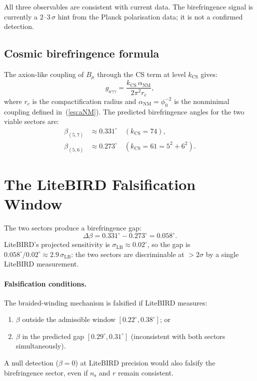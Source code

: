 \documentclass[12pt,a4paper]{article}
\newcommand{\kcs}{k_{\mathrm{CS}}}
\newcommand{\phiz}{\phi_0}
\newcommand{\ns}{n_{\mathrm{s}}}
\newcommand{\aNM}{\alpha_{\mathrm{NM}}}
\begin{document}
All three observables are consistent with current data.  The birefringence
signal is currently a $2$--$3\,\sigma$ hint from the Planck polarisation data;
it is not a confirmed detection.

\subsection{Cosmic birefringence formula}

The axion-like coupling of $B_\mu$ through the CS term at level $\kcs$ gives:
\begin{equation}
  g_{a\gamma\gamma} = \frac{\kcs\,\aNM}{2\pi^2 r_c} ,
  \label{eq:gcoup}
\end{equation}
where $r_c$ is the compactification radius and $\aNM=\phiz^{-2}$ is the
nonminimal coupling defined in~(\ref{eq:aNM}).
The predicted birefringence angles for the two viable sectors are:
\begin{align}
  \beta_{(5,7)} &\approx 0.331^\circ \quad (\kcs=74) , \\
  \beta_{(5,6)} &\approx 0.273^\circ \quad (\kcs=61=5^2+6^2) .
\end{align}

\section{The LiteBIRD Falsification Window}
\label{sec:litebird}

The two sectors produce a birefringence gap:
\begin{equation}
  \Delta\beta = 0.331^\circ - 0.273^\circ = 0.058^\circ .
  \label{eq:gap}
\end{equation}
LiteBIRD's projected sensitivity is $\sigma_{\mathrm{LB}}\approx 0.02^\circ$,
so the gap is $0.058^\circ/0.02^\circ \approx 2.9\,\sigma_{\mathrm{LB}}$:
the two sectors are discriminable at $>2\sigma$ by a single LiteBIRD
measurement.

\paragraph{Falsification conditions.}
The braided-winding mechanism is falsified if LiteBIRD measures:
\begin{enumerate}
  \item $\beta$ outside the admissible window $[0.22^\circ, 0.38^\circ]$; or
  \item $\beta$ in the predicted gap $[0.29^\circ, 0.31^\circ]$
        (inconsistent with both sectors simultaneously).
\end{enumerate}
A null detection ($\beta=0$) at LiteBIRD precision would also falsify the
birefringence sector, even if $\ns$ and $r$ remain consistent.
\end{document}
